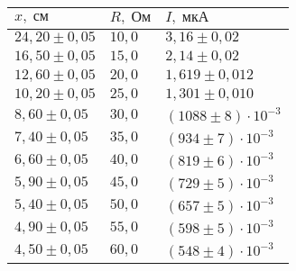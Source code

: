 \begin{tabular}{|l|l|l|}
\hline
$x,\;\text{см}$ & $R,\;\text{Ом}$ & $I,\;\text{мкА}$\\\hline
$24{,}20 \pm 0{,}05$ & $10{,}0$ & $3{,}16 \pm 0{,}02$\\\hline
$16{,}50 \pm 0{,}05$ & $15{,}0$ & $2{,}14 \pm 0{,}02$\\\hline
$12{,}60 \pm 0{,}05$ & $20{,}0$ & $1{,}619 \pm 0{,}012$\\\hline
$10{,}20 \pm 0{,}05$ & $25{,}0$ & $1{,}301 \pm 0{,}010$\\\hline
$8{,}60 \pm 0{,}05$ & $30{,}0$ & $\left(1088 \pm 8\right)\cdot 10^{-3}$\\\hline
$7{,}40 \pm 0{,}05$ & $35{,}0$ & $\left(934 \pm 7\right)\cdot 10^{-3}$\\\hline
$6{,}60 \pm 0{,}05$ & $40{,}0$ & $\left(819 \pm 6\right)\cdot 10^{-3}$\\\hline
$5{,}90 \pm 0{,}05$ & $45{,}0$ & $\left(729 \pm 5\right)\cdot 10^{-3}$\\\hline
$5{,}40 \pm 0{,}05$ & $50{,}0$ & $\left(657 \pm 5\right)\cdot 10^{-3}$\\\hline
$4{,}90 \pm 0{,}05$ & $55{,}0$ & $\left(598 \pm 5\right)\cdot 10^{-3}$\\\hline
$4{,}50 \pm 0{,}05$ & $60{,}0$ & $\left(548 \pm 4\right)\cdot 10^{-3}$\\\hline
\end{tabular}
